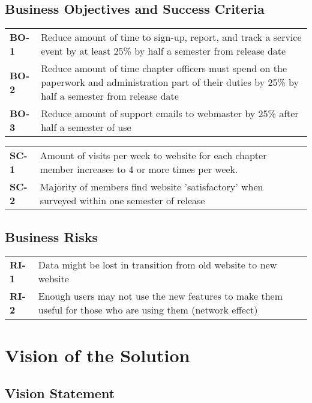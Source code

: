 \documentclass[11pt,letterpaper,rotate]{article}
\begin{document}
\subsection{Business Objectives and Success Criteria}
\FloatBarrier
\begin{longtable}{lp{12cm}}
{\bf BO-1} & Reduce amount of time to sign-up, report, and track a
service event by at least 25\% by half a semester from release date \\
{\bf BO-2} & Reduce amount of time chapter officers must spend on the
paperwork and administration part of their duties by 25\% by half a
semester from release date \\
{\bf BO-3} & Reduce amount of support emails to webmaster by 25\% after
half a semester of use \\
\end{longtable}

\FloatBarrier
\begin{longtable}{lp{12cm}}
{\bf SC-1} & Amount of visits per week to website for each chapter member
increases to 4 or more times per week. \\
{\bf SC-2} & Majority of members find website 'satisfactory' when surveyed
within one semester of release\\
\end{longtable}

\FloatBarrier

\subsection{Business Risks}

\FloatBarrier
\begin{longtable}{lp{12cm}}
{\bf RI-1} & Data might be lost in transition from old website to new
website \\
{\bf RI-2} & Enough users may not use the new features to make them useful
for those who are using them (network effect) \\
\end{longtable}

\section{Vision of the Solution}

\subsection{Vision Statement}
\end{document}
